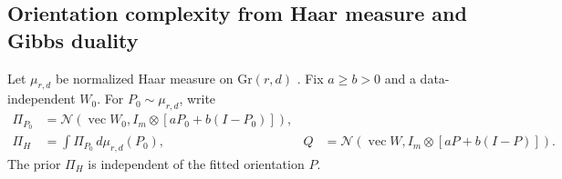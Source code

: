 \subsection{Orientation complexity from Haar measure and Gibbs duality}
\label{app:Grassmann-mixture-prior}
Let $\mu_{r,d}$ be normalized Haar measure on $\mathrm{Gr}(r,d)$
\cite{chikuse2003manifolds}. Fix $a\ge b>0$ and a data-independent $W_0$.
For $P_0\sim\mu_{r,d}$, write
\begin{align}
 \Pi_{P_0}&=\mathcal N(\operatorname{vec}W_0,
                      I_m\otimes[aP_0+b(I-P_0)]),\\
 \Pi_H&=\int\Pi_{P_0}\,d\mu_{r,d}(P_0),&
 Q&=\mathcal N(\operatorname{vec}W,I_m\otimes[aP+b(I-P)]).
\end{align}
The prior $\Pi_H$ is independent of the fitted orientation $P$.

